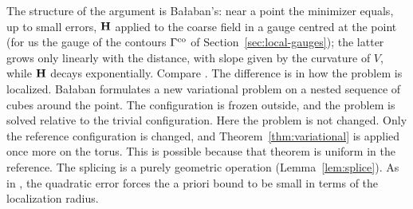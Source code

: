 \begin{remark}\label{x:29.3}
The structure of the argument is Ba\l aban's: near a point the minimizer equals, up to small errors, $\mathbf H$ applied to the coarse field in a gauge centred at the point (for us the gauge of the contours $\Gamma^{\rm co}$ of Section~\ref{sec:local-gauges}); the latter grows only linearly with the distance, with slope given by the curvature of $V$, while $\mathbf H$ decays exponentially. Compare \cite[(159)--(167)]{BalVar}. The difference is in how the problem is localized. Ba\l aban formulates a new variational problem on a nested sequence of cubes around the point. The configuration is frozen outside, and the problem is solved relative to the trivial configuration. Here the problem is not changed. Only the reference configuration is changed, and Theorem~\ref{thm:variational} is applied once more on the torus. This is possible because that theorem is uniform in the reference. The splicing is a purely geometric operation (Lemma~\ref{lem:splice}). As in \cite[(166)]{BalVar}, the quadratic error forces the a priori bound to be small in terms of the localization radius.
\end{remark}
